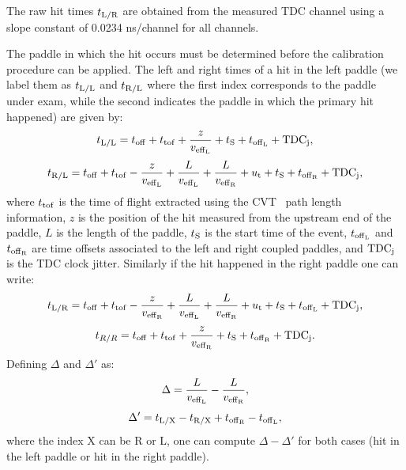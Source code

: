 The raw hit times $t_{{\rm{L}}/{\rm{R}}}$ are obtained from the measured TDC channel using a slope constant of 0.0234 ns/channel for all channels.

The paddle in which the hit occurs must be determined before the calibration procedure can be applied.
The left and right times of a hit in the left paddle (we label them as $t_{{\rm{L}}/{\rm{L}}}$ and $t_{\rm{R}/{\rm{L}}}$ where the first index corresponds to the paddle under exam, while the second indicates the paddle in which the primary hit happened) are given by:
\begin{equation}
t_{{\rm{L}}/{\rm{L}}}=t_{\rm{off}}+t_{\rm{tof}}+\frac{z}{v_{\rm{eff}_L}}+t_{\rm{S}}+t_{\rm{off}_{\rm{L}}}+{\rm{TDC}}_{\rm{j}},
\end{equation}
\begin{equation}
t_{{\rm{R}/{\rm{L}}}}=t_{\rm{off}}+t_{\rm{tof}}-\frac{z}{v_{\rm{eff}_L}}+\frac{L}{v_{\rm{eff}_L}}+\frac{L}{v_{\rm{eff}_{\rm{R}}}}+u_{\rm{t}}+t_{\rm{S}}+t_{\rm{off}_{\rm{R}}}+{\rm{TDC}}_{\rm{j}},
\end{equation}
where $t_{\rm{tof}}$ is the time of flight extracted using the CVT~\cite{cvtref} path length information, $z$ is the position of the hit measured from the upstream end of the paddle, $L$ is the length of the paddle, $t_{\rm{S}}$ is the start time of the event, $t_{\rm{off}_{\rm{L}}}$ and $t_{\rm{off}_{\rm{R}}}$ are time offsets associated to the left and right coupled paddles, and ${\rm{TDC}}_{\rm{j}}$ is the TDC clock jitter.
Similarly if the hit happened in the right paddle one can write:
\begin{equation}\label{eq_time_hit_lr}
t_{{\rm{L}}/{\rm{R}}}=t_{\rm{off}}+t_{\rm{tof}}-\frac{z}{v_{\rm{eff}_{\rm{R}}}}+\frac{L}{v_{\rm{eff}_L}}+\frac{L}{v_{\rm{eff}_{\rm{R}}}}+u_{\rm{t}}+t_{\rm{S}}+t_{\rm{off}_{\rm{L}}}+{\rm{TDC}}_{\rm{j}},
\end{equation}
\begin{equation}
t_{R/R}=t_{\rm{off}}+t_{\rm{tof}}+\frac{z}{v_{\rm{eff}_{\rm{R}}}}+t_{\rm{S}}+t_{\rm{off}_{\rm{R}}}+{\rm{TDC}}_{\rm{j}}.
\end{equation}
Defining $\Delta$ and $\Delta'$ as:
\begin{equation}
\Delta=\frac{L}{v_{\rm{eff}_L}}-\frac{L}{v_{\rm{eff}_{\rm{R}}}},
\end{equation}
\begin{equation}
\Delta'=t_{\rm{L}/{\rm{X}}}-t_{\rm{R}/{\rm{X}}}+t_{\rm{off}_{\rm{R}}}-t_{\rm{off}_{\rm{L}}},
\end{equation}
where the index X can be R or L, one can compute $\Delta-\Delta'$ for both cases (hit in the left paddle or hit in the right paddle).
